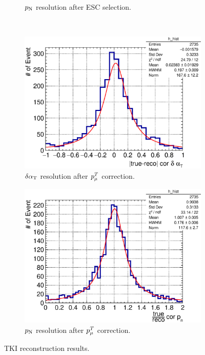 \begin{figure}[!htb]
\begin{subfigure}{0.45\textwidth}
                \caption{$p_\textrm{N}$ resolution after ESC selection.}
                \label{fig:pn-res-afESC}
           \end{subfigure}
           \\
            \begin{subfigure}{0.45\textwidth}
                \includegraphics[width=\textwidth]{figures/cor_dalphat_rat_hist_al14.eps}
                \caption{$\delta\alpha_\textrm{T}$ resolution after $p_{\mu}^T$ correction.}
                \label{fig:0pi-cordat}
           \end{subfigure}
           \begin{subfigure}{0.45\textwidth}
                \includegraphics[width=\textwidth]{figures/cor_pn_rat_hist_al14.eps}
                \caption{$p_\textrm{N}$ resolution after $p_{\mu}^T$ correction.}
                \label{fig:0pi-corpn}
           \end{subfigure}
           \caption{TKI reconstruction results.}
           \label{fig:tki-res-bfafESC}
        \end{figure}

